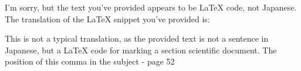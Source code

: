\relax
\providecommand\hyper@newdestlabel[2]{}
I'm sorry, but the text you've provided appears to be LaTeX code, not Japanese. The translation of the LaTeX snippet you've provided is:


This is not a typical translation, as the provided text is not a sentence in Japanese, but a LaTeX code for marking a section scientific document.
The position of this comma in the subject - page 52

